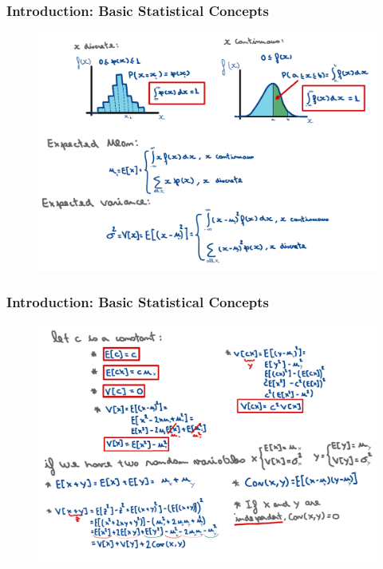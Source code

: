 \begin{frame}
    \frametitle{Introduction: Basic Statistical Concepts}
    \begin{figure}
        \centering
        \includegraphics[width=1\textwidth]{slides/figures/prob_review_part_one.pdf}
    \end{figure}
\end{frame}

\begin{frame}
    \frametitle{Introduction: Basic Statistical Concepts}
    \begin{figure}
        \centering
        \includegraphics[width=1\textwidth]{slides/figures/prob_review_part_two.pdf}
    \end{figure}
\end{frame}


